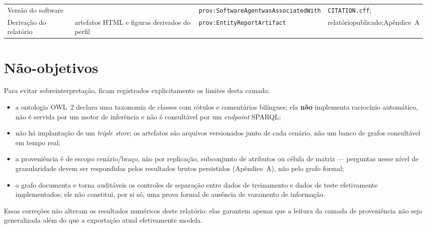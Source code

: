 \begin{footnotesize}
\begin{longtable}{>{\raggedright\arraybackslash}p{2.6cm}>{\raggedright\arraybackslash}p{4.0cm}>{\raggedright\arraybackslash}p{4.4cm}>{\raggedright\arraybackslash}p{3.4cm}}
\addlinespace
Versão do software & \CoInfoSim{} \CoInfoSimVersion{} & \texttt{prov:SoftwareAgent}\newline\texttt{wasAssociatedWith} & \texttt{CITATION.cff};\newline\cite{azevedo2026coinfosim} \\
\addlinespace
Derivação do relatório & artefatos HTML e figuras derivados do perfil & \texttt{prov:Entity}\newline\texttt{ReportArtifact} & relatório\newline publicado;\newline Apêndice~A \\
\bottomrule
\end{longtable}
\end{footnotesize}

\section{Não-objetivos}

Para evitar sobreinterpretação, ficam registrados explicitamente os limites desta camada:

\begin{itemize}
  \item a ontologia OWL~2 declara uma taxonomia de classes com rótulos e comentários bilíngues; ela \textbf{não} implementa raciocínio automático, não é servida por um motor de inferência e não é consultável por um \emph{endpoint} SPARQL;
  \item não há implantação de um \emph{triple store}; os artefatos são arquivos versionados junto de cada cenário, não um banco de grafos consultável em tempo real;
  \item a proveniência é de escopo cenário/braço, não por replicação, subconjunto de atributos ou célula de matriz --- perguntas nesse nível de granularidade devem ser respondidas pelos resultados brutos persistidos (Apêndice~A), não pelo grafo formal;
  \item o grafo documenta e torna auditáveis os controles de separação entre dados de treinamento e dados de teste efetivamente implementados; ele não constitui, por si só, uma prova formal de ausência de vazamento de informação.
\end{itemize}

Essas correções não alteram os resultados numéricos deste relatório: elas garantem apenas que a leitura da camada de proveniência não seja generalizada além do que a exportação atual efetivamente modela.
